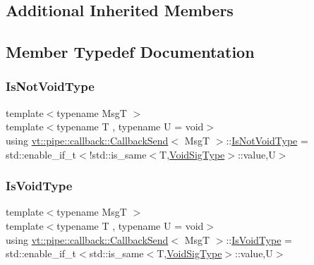\subsection*{Additional Inherited Members}


\subsection{Member Typedef Documentation}
\mbox{\label{structvt_1_1pipe_1_1callback_1_1_callback_send_adb85e64e67e00aa71a9c173565dfb7dc}} 
\subsubsection{\texorpdfstring{Is\+Not\+Void\+Type}{IsNotVoidType}}
{\footnotesize\ttfamily template$<$typename MsgT $>$ \\
template$<$typename T , typename U  = void$>$ \\
using \hyperlink{structvt_1_1pipe_1_1callback_1_1_callback_send}{vt\+::pipe\+::callback\+::\+Callback\+Send}$<$ MsgT $>$\+::\hyperlink{structvt_1_1pipe_1_1callback_1_1_callback_send_adb85e64e67e00aa71a9c173565dfb7dc}{Is\+Not\+Void\+Type} =  std\+::enable\+\_\+if\+\_\+t$<$!std\+::is\+\_\+same$<$T,\hyperlink{structvt_1_1pipe_1_1callback_1_1_callback_send_a4b1101ab77de5862de3b309c5d09b224}{Void\+Sig\+Type}$>$\+::value,U$>$}

\mbox{\label{structvt_1_1pipe_1_1callback_1_1_callback_send_afbb9475a84ba4a7b3db3c7493672dbe6}} 
\subsubsection{\texorpdfstring{Is\+Void\+Type}{IsVoidType}}
{\footnotesize\ttfamily template$<$typename MsgT $>$ \\
template$<$typename T , typename U  = void$>$ \\
using \hyperlink{structvt_1_1pipe_1_1callback_1_1_callback_send}{vt\+::pipe\+::callback\+::\+Callback\+Send}$<$ MsgT $>$\+::\hyperlink{structvt_1_1pipe_1_1callback_1_1_callback_send_afbb9475a84ba4a7b3db3c7493672dbe6}{Is\+Void\+Type} =  std\+::enable\+\_\+if\+\_\+t$<$std\+::is\+\_\+same$<$T,\hyperlink{structvt_1_1pipe_1_1callback_1_1_callback_send_a4b1101ab77de5862de3b309c5d09b224}{Void\+Sig\+Type}$>$\+::value,U$>$}

